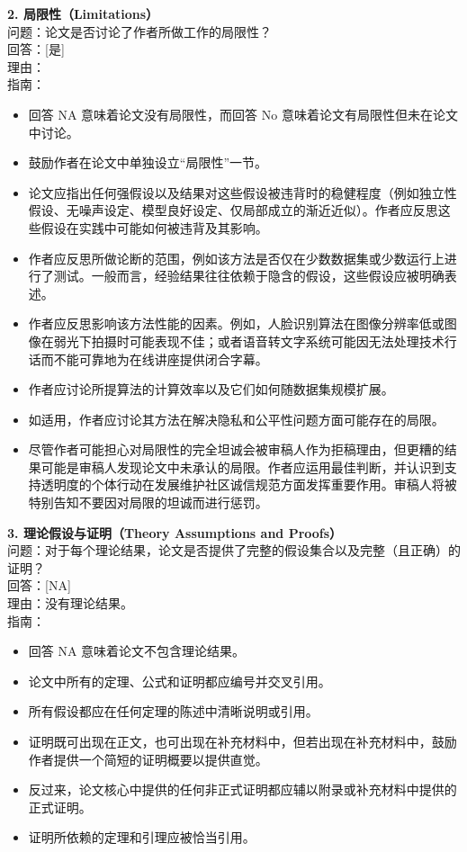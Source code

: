 \documentclass[11pt,UTF8,fontset=fandol]{ctexart}
\begin{document}
\textbf{2. 局限性（Limitations）}\\
问题：论文是否讨论了作者所做工作的局限性？\\
回答：[是]\\
理由：\\
指南：
\begin{itemize}[leftmargin=1.5em,itemsep=1pt]
\item 回答 NA 意味着论文没有局限性，而回答 No 意味着论文有局限性但未在论文中讨论。
\item 鼓励作者在论文中单独设立“局限性”一节。
\item 论文应指出任何强假设以及结果对这些假设被违背时的稳健程度（例如独立性假设、无噪声设定、模型良好设定、仅局部成立的渐近近似）。作者应反思这些假设在实践中可能如何被违背及其影响。
\item 作者应反思所做论断的范围，例如该方法是否仅在少数数据集或少数运行上进行了测试。一般而言，经验结果往往依赖于隐含的假设，这些假设应被明确表述。
\item 作者应反思影响该方法性能的因素。例如，人脸识别算法在图像分辨率低或图像在弱光下拍摄时可能表现不佳；或者语音转文字系统可能因无法处理技术行话而不能可靠地为在线讲座提供闭合字幕。
\item 作者应讨论所提算法的计算效率以及它们如何随数据集规模扩展。
\item 如适用，作者应讨论其方法在解决隐私和公平性问题方面可能存在的局限。
\item 尽管作者可能担心对局限性的完全坦诚会被审稿人作为拒稿理由，但更糟的结果可能是审稿人发现论文中未承认的局限。作者应运用最佳判断，并认识到支持透明度的个体行动在发展维护社区诚信规范方面发挥重要作用。审稿人将被特别告知不要因对局限的坦诚而进行惩罚。
\end{itemize}

\textbf{3. 理论假设与证明（Theory Assumptions and Proofs）}\\
问题：对于每个理论结果，论文是否提供了完整的假设集合以及完整（且正确）的证明？\\
回答：[NA]\\
理由：没有理论结果。\\
指南：
\begin{itemize}[leftmargin=1.5em,itemsep=1pt]
\item 回答 NA 意味着论文不包含理论结果。
\item 论文中所有的定理、公式和证明都应编号并交叉引用。
\item 所有假设都应在任何定理的陈述中清晰说明或引用。
\item 证明既可出现在正文，也可出现在补充材料中，但若出现在补充材料中，鼓励作者提供一个简短的证明概要以提供直觉。
\item 反过来，论文核心中提供的任何非正式证明都应辅以附录或补充材料中提供的正式证明。
\item 证明所依赖的定理和引理应被恰当引用。
\end{itemize}
\end{document}
